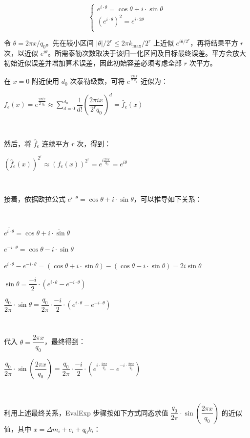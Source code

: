 \[
\begin{cases}
e^{i\cdot \theta} = \cos \theta + i \cdot \sin \theta\\
(e^{i \cdot \theta})^2 = e^{i\cdot 2\theta}\\
\end{cases}
\]

令 $\theta=2\pi x/q_0$。先在较小区间 $|\theta|/2^r\leq2\pi k_{\max}/2^r$ 上近似 $e^{i\theta/2^r}$，再将结果平方 $r$ 次，以近似 $e^{i\theta}$。所需泰勒次数取决于该归一化区间及目标最终误差。平方会放大初始近似误差并增加算术误差，因此初始容差必须考虑全部 $r$ 次平方。

在 $x = 0$ 附近使用 $d_0$ 次泰勒级数，可将 $e^{\frac{2\pi i x}{2^r q_0}}$ 近似为：

$f_e(x) = e^{\frac{2\pi i x}{2^r q_0}} \approx \sum\limits_{d=0}^{d_0}\dfrac{1}{d!}\left(\dfrac{2\pi i x}{2^rq_0}\right)^d = \hat{f}_e(x)$

$ $

然后，将 $\hat{f}_e$ 连续平方 $r$ 次，得到：

$(\hat{f}_e(x))^{2^r} \approx (f_e(x))^{2^r} = e^{i\frac{2\pi x}{q_0}} = e^{i\theta}$

$ $

接着，依据欧拉公式 $e^{i\cdot \theta} = \cos \theta + i \cdot \sin \theta$，可以推导如下关系：

$ $

$\overline{e^{i\cdot \theta}} = \cos \theta + \overline{i \cdot \sin \theta} $

$ e^{-i\cdot \theta} = \cos \theta - i \cdot \sin \theta$

$ e^{i\cdot \theta} - e^{-i\cdot \theta} = (\cos \theta + i \cdot \sin \theta) - (\cos \theta - i \cdot \sin \theta) = 2i\sin \theta$

$\sin \theta = \dfrac{-i}{2} \cdot (e^{i\cdot \theta} - e^{-i\cdot \theta})$

$\dfrac{q_0}{2\pi}\cdot \sin \theta = \dfrac{q_0}{2\pi}\cdot \dfrac{-i}{2} \cdot (e^{i\cdot \theta} - e^{-i\cdot \theta})$

$ $

代入 $\theta = \dfrac{2\pi x}{q_0}$，最终得到：

$\dfrac{q_0}{2\pi}\cdot \sin \left(\dfrac{2\pi x}{q_0}\right) = \dfrac{q_0}{2\pi}\cdot \dfrac{-i}{2} \cdot (e^{i\cdot \frac{2\pi x}{q_0}} - e^{-i\cdot \frac{2\pi x}{q_0}})$

$ $

利用上述最终关系，\textsf{EvalExp} 步骤按如下方式同态求值 $\dfrac{q_0}{2\pi}\cdot \sin \left(\dfrac{2\pi x}{q_0}\right)$ 的近似值，其中 $x = \Delta m_i + e_i + q_0k_i$：

